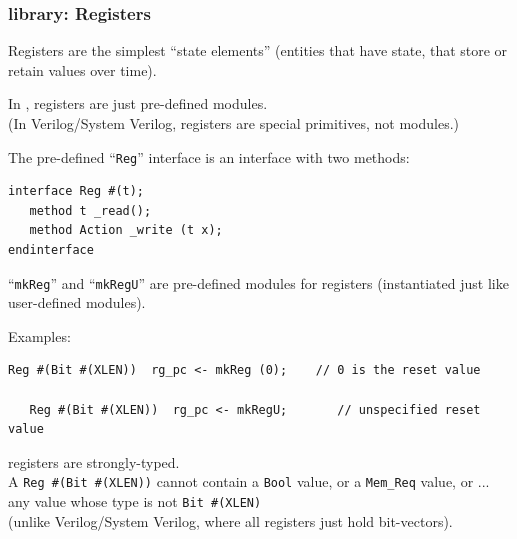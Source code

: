 \begin{frame}[fragile]
\frametitle{{\BSV} library: Registers}

\footnotesize

Registers are the simplest ``state elements'' (entities that have
state, {\ie} that store or retain values over time).

\vspace{2ex}

In {\BSV}, registers are just pre-defined modules. \\
(In Verilog/System Verilog, registers are special primitives, not modules.)

\vspace{2ex}

The pre-defined ``{\tt Reg}'' interface is an interface with two methods:

\begin{Verbatim}[frame=single]
interface Reg #(t);
   method t _read();
   method Action _write (t x);
endinterface
\end{Verbatim}

\vspace{1ex}


``{\tt mkReg}'' and ``{\tt mkRegU}'' are pre-defined {\BSV} modules
for registers (instantiated just like user-defined modules).

Examples:

\begin{Verbatim}[frame=single]
   Reg #(Bit #(XLEN))  rg_pc <- mkReg (0);    // 0 is the reset value

   Reg #(Bit #(XLEN))  rg_pc <- mkRegU;       // unspecified reset value
\end{Verbatim}

\vspace{2ex}

{\BSV} registers are strongly-typed. \\
A \verb|Reg #(Bit #(XLEN))| cannot contain a {\tt Bool} value,
  or a \verb|Mem_Req| value,
  or ... any value whose type is not \verb|Bit #(XLEN)| \\
(unlike Verilog/System Verilog, where all registers just hold bit-vectors).

\end{frame}


